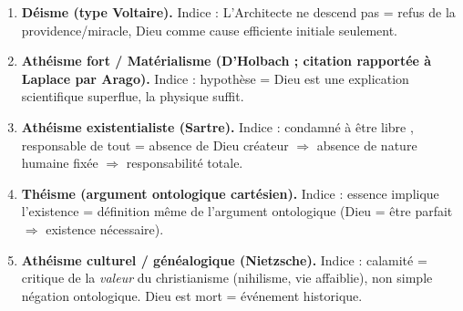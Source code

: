 \documentclass[11pt]{article}
\begin{document}
\begin{corrige}[Exercice n°1]
\begin{enumerate}
    \item \textbf{Déisme (type Voltaire).} Indice : \guillemotleft L'Architecte ne descend pas \guillemotright = refus de la providence/miracle, Dieu comme cause efficiente initiale seulement.
    \item \textbf{Athéisme fort / Matérialisme (D'Holbach ; citation rapportée à Laplace par Arago).} Indice : \guillemotleft hypothèse \guillemotright = Dieu est une explication scientifique superflue, la physique suffit.
    \item \textbf{Athéisme existentialiste (Sartre).} Indice : \guillemotleft condamné à être libre \guillemotright, \guillemotleft responsable de tout \guillemotright = absence de Dieu créateur $\Rightarrow$ absence de nature humaine fixée $\Rightarrow$ responsabilité totale.
    \item \textbf{Théisme (argument ontologique cartésien).} Indice : \guillemotleft essence implique l'existence \guillemotright = définition même de l'argument ontologique (Dieu = être parfait $\Rightarrow$ existence nécessaire).
    \item \textbf{Athéisme culturel / généalogique (Nietzsche).} Indice : \guillemotleft calamité \guillemotright = critique de la \emph{valeur} du christianisme (nihilisme, vie affaiblie), non simple négation ontologique. \guillemotleft Dieu est mort \guillemotright = événement historique.
\end{enumerate}
\end{corrige}
\end{document}

